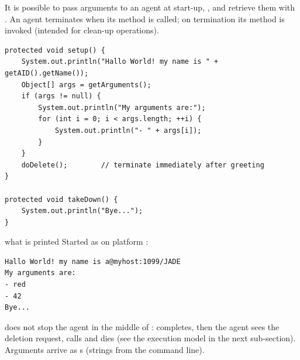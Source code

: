 It is possible to pass arguments to an agent at start-up,
, and retrieve them with
. An agent terminates when its  method is called; on
termination its  method is invoked (intended for clean-up operations).
\begin{verbatim}
protected void setup() {
    System.out.println("Hallo World! my name is " + getAID().getName());
    Object[] args = getArguments();
    if (args != null) {
        System.out.println("My arguments are:");
        for (int i = 0; i < args.length; ++i) {
            System.out.println("- " + args[i]);
        }
    }
    doDelete();        // terminate immediately after greeting
}

protected void takeDown() {
    System.out.println("Bye...");
}
\end{verbatim}

\begin{nbexample}{what is printed}
\notinslides
Started as  on platform :
\begin{verbatim}
Hallo World! my name is a@myhost:1099/JADE
My arguments are:
- red
- 42
Bye...
\end{verbatim}
 does not stop the agent in the middle of : 
completes, then the agent sees the deletion request, calls  and dies (see
the execution model in the next sub-section). Arguments arrive as s (strings
from the command line).
\end{nbexample}
